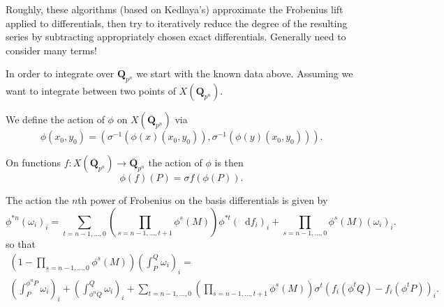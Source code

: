 \documentclass[oneside,11pt,]{article}
\newcommand{\diff}{\mathop{}\!\mathrm{d}}
\newcommand{\inv}{^{-1}}
\newcommand{\QQ}{\mathbf{Q}}
\let\emph\relax %
\begin{document}
Roughly, these algorithms (based on Kedlaya's) approximate the Frobenius lift applied to differentials, then try to iteratively reduce the degree of the resulting series by subtracting appropriately chosen exact differentials.
Generally need to consider many terms!

\emph{Over extension fields:}
In order to integrate over $\QQ_{p^n}$ we start with the known data above.
Assuming we want to integrate between two points of $X(\QQ_{p^n})$.

We define the action of \(\phi \) on \(X(\overline {\QQ}_{p^n})\) via%
\begin{equation*}
\phi (x_0, y_0) = (\sigma \inv (\phi (x) (x_0, y_0)), \sigma \inv (\phi (y)(x_0,y_0)))\text{.}\label{x:men:eqn-pt-act}
\end{equation*}
%
\par
On functions \(f\colon X(\overline{\QQ}_{p^n}) \to \overline{\QQ}_{p^n}\) the action of \(\phi \) is then%
\begin{equation*}
\phi (f)(P) = \sigma f(\phi (P))\text{.}\label{x:men:eqn-fun-act}
\end{equation*}

The action the \(n\)th power of Frobenius on the basis differentials is given by%
\begin{equation*}
\phi ^{*n} (\omega_i)_i  = \sum_{t = n-1,\ldots, 0} \left(\prod_{s=n-1, \ldots, t+1} \phi^s(M)\right)\phi ^{*t}(\diff f_i)_i + \prod_{s = n-1, \ldots, 0}\phi ^s(M) (\omega _i)_i\text{.}\label{x:men:eqn-nth-power-frob-act}
\end{equation*}
so that
\begin{gather*}
\left(1 - \prod_{s = n-1, \ldots, 0}\phi ^s(M)\right) \left(\int_{P}^{Q}\omega _i \right)_i = \label{g:mrow:idm445039011104}\\
\left(\int_P^{\phi ^{n}P} \omega _i\right)_i+ \left(\int_{\phi ^{n} Q}^Q \omega _i\right)_i         + \sum_{t = n-1,\ldots, 0} \left(\prod_{s=n-1, \ldots, t+1} \phi^s(M)\right)\sigma^t\left(f_i(\phi ^t Q) - f_i(\phi ^t P)\right)_i\text{.}\label{x:mrow:eqn-final-linear}
\end{gather*}
\par
\end{document}
